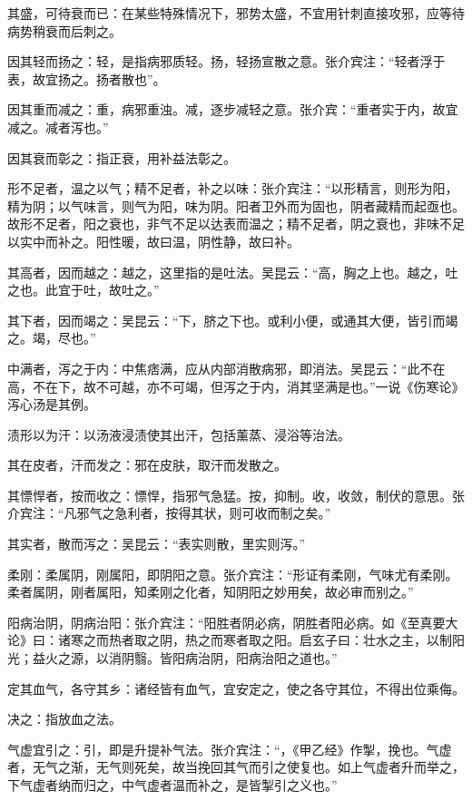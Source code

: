 \documentclass[draft,12pt]{ctexbook}
\begin{document}
\begin{jiaozhu}
	\item 其盛，可待衰而已：在某些特殊情况下，邪势太盛，不宜用针刺直接攻邪，应等待病势稍衰而后刺之。
	\item 因其轻而扬之：轻，是指病邪质轻。扬，轻扬宣散之意。张介宾注：“轻者浮于表，故宜扬之。扬者散也”。
	\item 因其重而减之：重，病邪重浊。减，逐步减轻之意。张介宾：“重者实于内，故宜减之。减者泻也。”
	\item 因其衰而彰之：指正衰，用补益法彰之。
	\item 形不足者，温之以气；精不足者，补之以味：张介宾注：“以形精言，则形为阳，精为阴；以气味言，则气为阳，味为阴。阳者卫外而为固也，阴者藏精而起亟也。故形不足者，阳之衰也，非气不足以达表而温之；精不足者，阴之衰也，非味不足以实中而补之。阳性暖，故曰温，阴性静，故曰补。
	\item 其高者，因而越之：越之，这里指的是吐法。吴昆云：“高，胸之上也。越之，吐之也。此宜于吐，故吐之。”
	\item 其下者，因而竭之：吴昆云：“下，脐之下也。或利小便，或通其大便，皆引而竭之。竭，尽也。”
	\item 中满者，泻之于内：中焦痞满，应从内部消散病邪，即消法。吴昆云：“此不在高，不在下，故不可越，亦不可竭，但泻之于内，消其坚满是也。”一说《伤寒论》泻心汤是其例。
	\item 渍形以为汗：以汤液浸渍使其出汗，包括薰蒸、浸浴等治法。
	\item 其在皮者，汗而发之：邪在皮肤，取汗而发散之。
	\item 其慓悍者，按而收之：慓悍，指邪气急猛。按，抑制。收，收敛，制伏的意思。张介宾注：“凡邪气之急利者，按得其状，则可收而制之矣。”
	\item 其实者，散而泻之：吴昆云：“表实则散，里实则泻。”
	\item 柔刚：柔属阴，刚属阳，即阴阳之意。张介宾注：“形证有柔刚，气味尤有柔刚。柔者属阴，刚者属阳，知柔刚之化者，知阴阳之妙用矣，故必审而别之。”
	\item 阳病治阴，阴病治阳：张介宾注：“阳胜者阴必病，阴胜者阳必病。如《至真要大论》曰：诸寒之而热者取之阴，热之而寒者取之阳。启玄子曰：壮水之主，以制阳光；益火之源，以消阴翳。皆阳病治阴，阳病治阳之道也。”
	\item 定其血气，各守其乡：诸经皆有血气，宜安定之，使之各守其位，不得出位乘侮。
	\item 决之：指放血之法。
	\item 气虚宜引之：引，即是升提补气法。张介宾注：“，《甲乙经》作掣，挽也。气虚者，无气之渐，无气则死矣，故当挽回其气而引之使复也。如上气虚者升而举之，下气虚者纳而归之，中气虚者温而补之，是皆掣引之义也。”
\end{jiaozhu}
\end{document}
